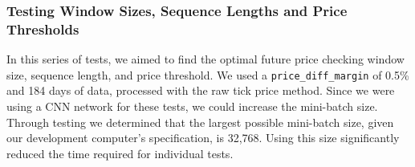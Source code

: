 \documentclass[a4paper,oneside,onecolumn,12pt]{book}
\begin{document}
		\subsubsection{Testing Window Sizes, Sequence Lengths and Price Thresholds}
		In this series of tests, we aimed to find the optimal future price checking window size, sequence length, and price threshold. We used a \texttt{price\_diff\_margin} of 0.5\% and 184 days of data, processed with the raw tick price method. Since we were using a CNN network for these tests, we could increase the mini-batch size. Through testing we determined that the largest possible mini-batch size, given our development computer's specification, is 32,768. Using this size significantly reduced the time required for individual tests.

		\begin{table}[H]
			\begin{center}
			\end{center}
			\caption{Results of experiments on price threshold, price check window size, and sequence length.}
			\label{table:pdt_ws_sl}
		\end{table}
\end{document}
